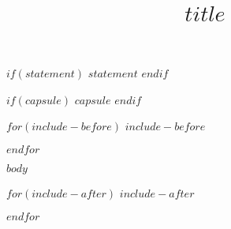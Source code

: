 \documentclass[$if(twocol)$twocol$endif$]{ametsocV6.1}
\title{$title$}
\affiliation{
$if(affiliations/allbutlast)$
$for(affiliations/allbutlast)$
\aff{$it.aff$}{$it.name$}\\
$endfor$
$endif$
$for(affiliations/last)$
\aff{$it.aff$}{$it.name$}
$endfor$
}
\begin{document}
\maketitle


%
%
%
%

$if(statement)$
$statement$
$endif$ %

%

$if(capsule)$
$capsule$
$endif$

%

$for(include-before)$
$include-before$

$endfor$

%

$body$

$for(include-after)$
$include-after$

$endfor$
\end{document}
